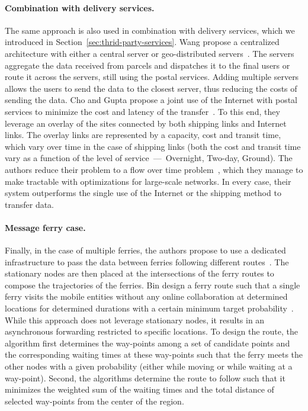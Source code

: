 \paragraph{Combination with delivery services.}
The same approach is also used in combination with delivery services, which we introduced in Section~\ref{sec:thrid-party-services}. Wang \etal propose a centralized architecture with either a central server or geo-distributed servers~\cite{wang2004turning}. The servers aggregate the data received from parcels and dispatches it to the final users or route it across the servers, still using the postal services. Adding multiple servers allows the users to send the data to the closest server, thus reducing the costs of sending the data. Cho and Gupta propose a joint use of the Internet with postal services to minimize the cost and latency of the transfer~\cite{cho2010new,cho2011budget}. To this end, they leverage an overlay of the sites connected by both shipping links and Internet links. The overlay links are represented by a capacity, cost and transit time, which vary over time in the case of shipping links (\eg both the cost and transit time vary as a function of the level of service~---~Overnight, Two-day, Ground). The authors reduce their problem to a flow over time problem~\cite{fleischer2007quickest}, which they manage to make tractable with optimizations for large-scale networks. In every case, their system outperforms the single use of the Internet or the shipping method to transfer data. 

\paragraph{Message ferry case.}
Finally, in the case of multiple ferries, the authors propose to use a dedicated infrastructure to pass the data between ferries following different routes~\cite{zhao2005controlling}. The stationary nodes are then placed at the intersections of the ferry routes to compose the trajectories of the ferries. Bin \etal design a ferry route such that a single ferry visits the mobile entities without any online collaboration at determined locations for determined durations with a certain minimum target probability~\cite{bin2006message}. While this approach does not leverage stationary nodes, it results in an asynchronous forwarding restricted to specific locations. To design the route, the algorithm first determines the way-points among a set of candidate points and the corresponding waiting times at these way-points such that the ferry meets the other nodes with a given probability (either while moving or while waiting at a way-point). Second, the algorithms determine the route to follow such that it minimizes the weighted sum of the waiting times and the total distance of selected way-points from the center of the region.

